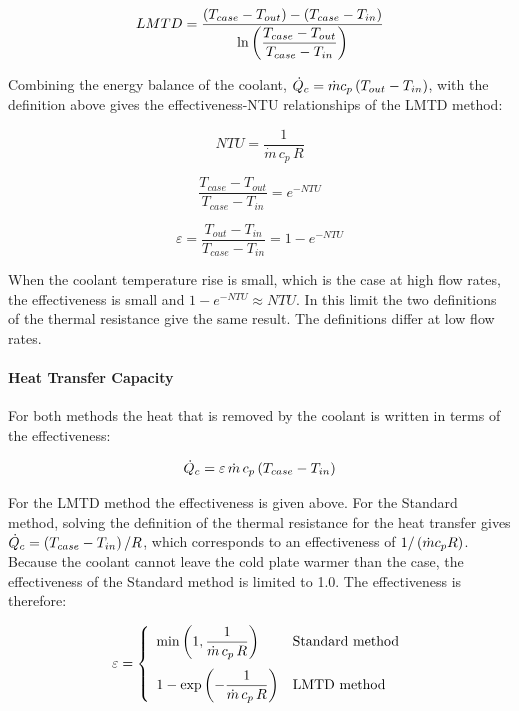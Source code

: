 \begin{equation}
LMTD = \frac{\left(T_{case} - T_{out}\right) - \left(T_{case} - T_{in}\right)}{\ln\left(\dfrac{T_{case} - T_{out}}{T_{case} - T_{in}}\right)}
\end{equation}

Combining the energy balance of the coolant, \(\dot{Q}_{c} = \dot{m} c_p \left(T_{out} - T_{in}\right)\), with the definition above gives the effectiveness-NTU relationships of the LMTD method:

\begin{equation}
NTU = \frac{1}{\dot{m} \, c_p \, R}
\end{equation}

\begin{equation}
\frac{T_{case} - T_{out}}{T_{case} - T_{in}} = e^{-NTU}
\end{equation}

\begin{equation}
\varepsilon = \frac{T_{out} - T_{in}}{T_{case} - T_{in}} = 1 - e^{-NTU}
\end{equation}

When the coolant temperature rise is small, which is the case at high flow rates, the effectiveness is small and \(1 - e^{-NTU} \approx NTU\). In this limit the two definitions of the thermal resistance give the same result. The definitions differ at low flow rates.

\paragraph{Heat Transfer Capacity}\label{heat-transfer-capacity-coilcoolingitecoldplate}

For both methods the heat that is removed by the coolant is written in terms of the effectiveness:

\begin{equation}
\dot{Q}_{c} = \varepsilon \, \dot{m} \, c_p \left(T_{case} - T_{in}\right)
\end{equation}

For the LMTD method the effectiveness is given above. For the Standard method, solving the definition of the thermal resistance for the heat transfer gives \(\dot{Q}_{c} = \left(T_{case} - T_{in}\right)/R\), which corresponds to an effectiveness of \(1/\left(\dot{m} c_p R\right)\). Because the coolant cannot leave the cold plate warmer than the case, the effectiveness of the Standard method is limited to 1.0. The effectiveness is therefore:

\begin{equation}
\varepsilon = \left\{
  \begin{array}{ll}
    \min\left(1, \dfrac{1}{\dot{m} \, c_p \, R}\right) & \text{Standard method} \\[3ex]
    1 - \exp\left(-\dfrac{1}{\dot{m} \, c_p \, R}\right) & \text{LMTD method}
  \end{array}
\right.
\end{equation}

